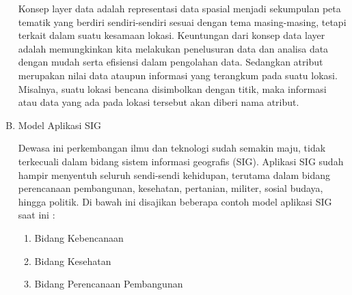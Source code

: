 \begin{enumerate}[A.]
Konsep layer data adalah representasi data spasial menjadi sekumpulan peta tematik yang berdiri sendiri-sendiri sesuai dengan tema masing-masing, tetapi terkait dalam suatu kesamaan lokasi. Keuntungan dari konsep data layer adalah memungkinkan kita melakukan penelusuran data dan analisa data dengan mudah serta efisiensi dalam pengolahan data. Sedangkan atribut merupakan nilai data ataupun informasi yang terangkum pada suatu lokasi. Misalnya, suatu lokasi bencana disimbolkan dengan titik, maka informasi atau data yang ada pada lokasi tersebut akan diberi nama atribut.

\item Model Aplikasi SIG

Dewasa ini perkembangan ilmu dan teknologi sudah semakin maju, tidak terkecuali dalam bidang sistem informasi geografis (SIG). Aplikasi SIG sudah hampir menyentuh seluruh sendi-sendi kehidupan, terutama dalam bidang perencanaan pembangunan, kesehatan, pertanian, militer, sosial budaya, hingga politik. Di bawah ini disajikan beberapa contoh model aplikasi SIG saat ini :

\begin{enumerate}[1.]
\item Bidang Kebencanaan

\item Bidang Kesehatan

\item Bidang Perencanaan Pembangunan
\end{enumerate}

\end{enumerate}
